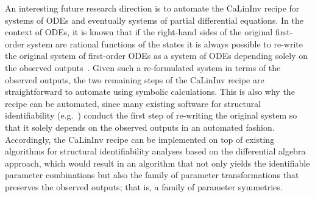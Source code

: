 \documentclass[12pt]{article}
\begin{document}
An interesting future research direction is to automate the CaLinInv recipe for systems of ODEs and eventually systems of partial differential equations. In the context of ODEs, it is known that if the right-hand sides of the original first-order system are rational functions of the states it is always possible to re-write the original system of first-order ODEs as a system of ODEs depending solely on the observed outputs~\cite{ljung1994global}. Given such a re-formulated system in terms of the observed outputs, the two remaining steps of the CaLinInv recipe are straightforward to automate using symbolic calculations. This is also why the recipe can be automated, since many existing software for structural identifiability (e.g.~\cite{dong2023structuralIdentifiabilityJL}) conduct the first step of re-writing the original system so that it solely depends on the observed outputs in an automated fashion. Accordingly, the CaLinInv recipe can be implemented on top of existing algorithms for structural identifiability analyses based on the differential algebra approach, which would result in an algorithm that not only yields the identifiable parameter combinations but also the family of parameter transformations that preserves the observed outputs; that is, a family of parameter symmetries. 
\end{document}
